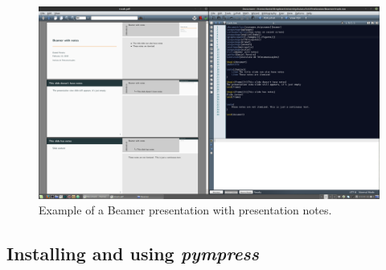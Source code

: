 \begin{figure}[h]
\centering
\includegraphics[width=\linewidth]{../chapter/beamer/figures/codeANDslideEXAMPLE.png}
\caption{Example of a Beamer presentation with presentation notes.}
\label{fig:slidesAndNotesExample}
\end{figure}

\subsection{Installing and using \textit{pympress}}

